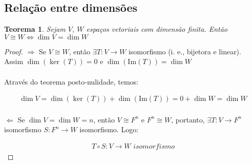 \documentclass{article}
\newcommand{\kernel}[1] {\ker \left( #1 \right)}
\newcommand{\imagem}[1] {\text{Im} \left( #1 \right)}
\newcommand{\posto}[1] {\dim{\left( \imagem{#1} \right)}}
\newcommand{\nul}[1] {\dim{ \left( \kernel{#1} \right) }}
\newcommand{\deffunc}[3] {#1: #2 \longrightarrow #3}
\newtheorem{theorem}{Teorema}[section]
\begin{document}
        \subsection{Relação entre dimensões}
            \begin{theorem}
                Sejam $V$, $W$ espaços vetoriais com dimensão finita. Então $V \cong W \Leftrightarrow \dim{V} = \dim{W}$
            \end{theorem}
            \begin{proof}
                $\Rightarrow$ Se $V \cong W$, então $\exists \deffunc{T}{V}{W}$ isomorfismo (i. e., bijetora e linear).
                Assim $\nul{T} = 0$ e $\posto{T} = \dim W$

                \paragraph{}
                Através do teorema posto-nulidade, temos:

                \begin{align*}
                    \dim{V} = \nul{T} + \posto{T} = 0 + \dim{W} = \dim{W}
                \end{align*}

                \paragraph{}
                $\Leftarrow$ Se $\dim{V} = \dim{W} = n$, então $V \cong F^n$ e $F^n \cong W$, portanto,
                $\exists \deffunc{T}{V}{F^n}$ isomorfismo $\deffunc{S}{F^n}{W}$ isomorfismo. Logo:

                \begin{align*}
                    \deffunc{T \circ S}{V}{W} \textit{ isomorfismo}
                \end{align*}
            \end{proof}
\end{document}
